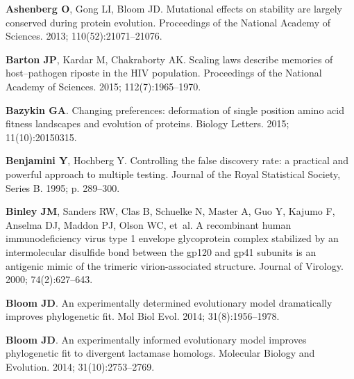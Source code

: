 \documentclass[9pt]{elife}
\begin{document}
\begin{thebibliography}{114}
\textbf{\color{eLifeMediumGrey} Ashenberg O}, Gong LI, Bloom JD.
\newblock Mutational effects on stability are largely conserved during protein
  evolution.
\newblock Proceedings of the National Academy of Sciences.  2013;
  110(52):21071--21076.

\textbf{\color{eLifeMediumGrey} Barton JP}, Kardar M, Chakraborty AK.
\newblock Scaling laws describe memories of host--pathogen riposte in the {HIV}
  population.
\newblock Proceedings of the National Academy of Sciences.  2015;
  112(7):1965--1970.

\textbf{\color{eLifeMediumGrey} Bazykin GA}.
\newblock Changing preferences: deformation of single position amino acid
  fitness landscapes and evolution of proteins.
\newblock Biology Letters.  2015; 11(10):20150315.

\textbf{\color{eLifeMediumGrey} Benjamini Y}, Hochberg Y.
\newblock Controlling the false discovery rate: a practical and powerful
  approach to multiple testing.
\newblock Journal of the Royal Statistical Society, Series B.  1995; p.
  289--300.

\textbf{\color{eLifeMediumGrey} Binley JM}, Sanders RW, Clas B, Schuelke N,
  Master A, Guo Y, Kajumo F, Anselma DJ, Maddon PJ, Olson WC, et~al.
\newblock A recombinant human immunodeficiency virus type 1 envelope
  glycoprotein complex stabilized by an intermolecular disulfide bond between
  the gp120 and gp41 subunits is an antigenic mimic of the trimeric
  virion-associated structure.
\newblock Journal of Virology.  2000; 74(2):627--643.

\textbf{\color{eLifeMediumGrey} Bloom JD}.
\newblock An experimentally determined evolutionary model dramatically improves
  phylogenetic fit.
\newblock Mol Biol Evol.  2014; 31(8):1956--1978.

\textbf{\color{eLifeMediumGrey} Bloom JD}.
\newblock An experimentally informed evolutionary model improves phylogenetic
  fit to divergent lactamase homologs.
\newblock Molecular Biology and Evolution.  2014; 31(10):2753--2769.


\end{thebibliography}
\end{document}
